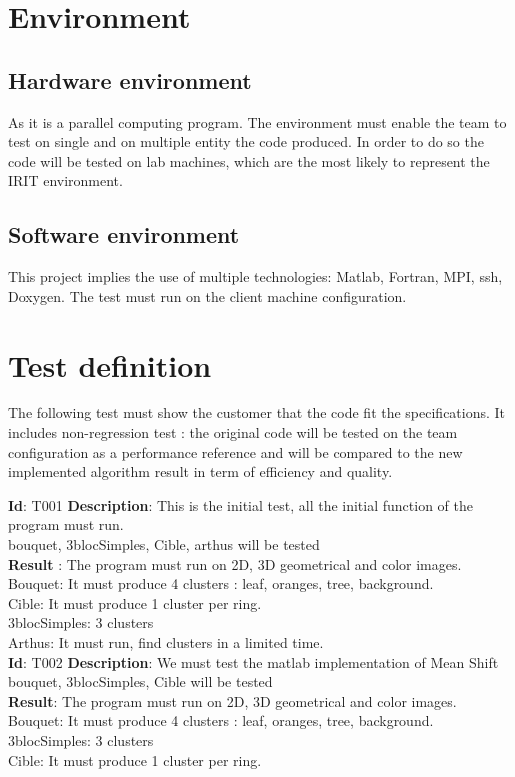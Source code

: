 \section{Environment}
\subsection{Hardware environment}
As it is a parallel computing program. The environment must enable the team to test on single and on multiple entity the code produced. In order to do so the code will be tested on lab machines, which are the most likely to represent the IRIT environment. 
\subsection{Software environment}
This project implies the use of multiple technologies: Matlab, Fortran, MPI, ssh, Doxygen. The test must run on the client machine configuration.

\section{Test definition}
The following test must show the customer that the code fit the specifications. It includes non-regression test : the original code will be tested on the team configuration as a performance reference and will be compared to the new implemented algorithm result in term of efficiency and quality.

\textbf{Id}: T001
\textbf{Description}: This is the initial test, all the initial function of the program must run. \\
bouquet, 3blocSimples, Cible, arthus will be tested\\
\textbf{Result} : The program must run on 2D, 3D geometrical and color images. \\
Bouquet: It must produce 4 clusters : leaf, oranges, tree, background.\\
Cible: It must produce 1 cluster per ring.\\
3blocSimples: 3 clusters\\
Arthus: It must run, find clusters in a limited time.\\

\textbf{Id}: T002
\textbf{Description}: We must test the matlab implementation of Mean Shift \\
bouquet, 3blocSimples, Cible will be tested\\
\textbf{Result}: The program must run on 2D, 3D geometrical and color images. \\
Bouquet: It must produce 4 clusters : leaf, oranges, tree, background.\\
3blocSimples: 3 clusters\\
Cible: It must produce 1 cluster per ring.\\

